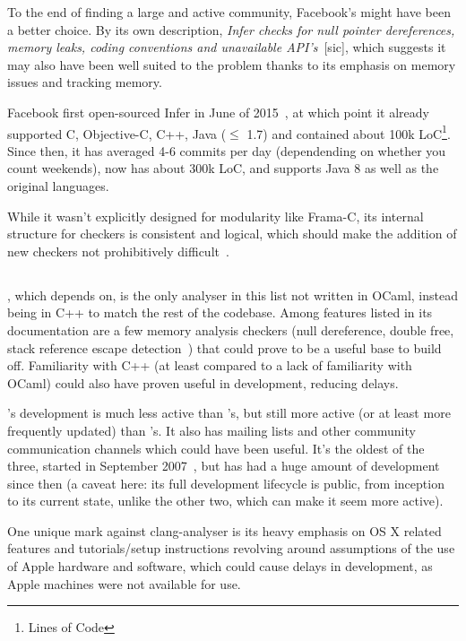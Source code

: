 To the end of finding a large and active community, Facebook's  might have been a better choice. By its own description, \textit{Infer checks for null pointer dereferences, memory leaks, coding conventions and unavailable API’s}~[sic], which suggests it may also have been well suited to the problem thanks to its emphasis on memory issues and tracking memory.

Facebook first open-sourced Infer in June of 2015~\cite{infergit}, at which point it already supported C, Objective-C, C++, Java ($\le$ 1.7) and contained about 100k LoC\footnote{Lines of Code}. Since then, it has averaged 4-6 commits per day (dependending on whether you count weekends), now has about 300k LoC, and supports Java 8 as well as the original languages.

While it wasn't explicitly designed for modularity like Frama-C, its internal structure for checkers is consistent and logical, which should make the addition of new checkers not prohibitively difficult~\cite{infercheckers}.

\subsection{}

, which  depends on, is the only analyser in this list not written in OCaml, instead being in C++ to match the rest of the  codebase. Among features listed in its documentation are a few memory analysis checkers (null dereference, double free, stack reference escape detection~\cite{clangchecks}) that could prove to be a useful base to build off. Familiarity with C++ (at least compared to a lack of familiarity with OCaml) could also have proven useful in development, reducing delays.

's development is much less active than 's, but still more active (or at least more frequently updated) than 's. It also has mailing lists and other community communication channels which could have been useful. It's the oldest of the three, started in September 2007~\cite{clangrelease}, but has had a huge amount of development since then (a caveat here: its full development lifecycle is public, from inception to its current state, unlike the other two, which can make it seem more active).

One unique mark against clang-analyser is its heavy emphasis on OS X related features and tutorials/setup instructions revolving around assumptions of the use of Apple hardware and software, which could cause delays in development, as Apple machines were not available for use.


